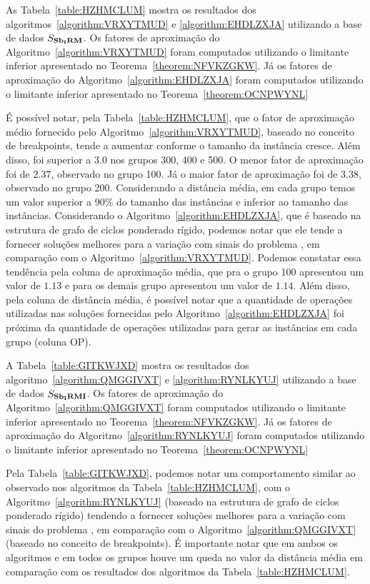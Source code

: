 As Tabela~\ref{table:HZHMCLUM} mostra os resultados dos algoritmos~\ref{algorithm:VRXYTMUD} e \ref{algorithm:EHDLZXJA} utilizando a base de dados $S_{\textbf{Sb\textsubscript{I}RM}}{}$. Os fatores de aproximação do Algoritmo~\ref{algorithm:VRXYTMUD} foram computados utilizando o limitante inferior apresentado no Teorema~\ref{theorem:NFVKZGKW}. Já os fatores de aproximação do Algoritmo~\ref{algorithm:EHDLZXJA} foram computados utilizando o limitante inferior apresentado no Teorema~\ref{theorem:OCNPWYNL}



É possível notar, pela Tabela~\ref{table:HZHMCLUM}, que o fator de aproximação médio fornecido pelo Algoritmo~\ref{algorithm:VRXYTMUD}, baseado no conceito de breakpoints, tende a aumentar conforme o tamanho da instância cresce. Além disso, foi superior a $3.0$ nos grupos 300, 400 e 500. O menor fator de aproximação foi de $2.37$, observado no grupo 100. Já o maior fator de aproximação foi de $3.38$, observado no grupo 200. Considerando a distância média, em cada grupo temos um valor superior a 90\% do tamanho das instâncias e inferior ao tamanho das instâncias. Considerando o Algoritmo~\ref{algorithm:EHDLZXJA}, que é baseado na estrutura de grafo de ciclos ponderado rígido, podemos notar que ele tende a fornecer soluções melhores para a variação com sinais do problema \SbIRM{}, em comparação com o Algoritmo~\ref{algorithm:VRXYTMUD}. Podemos constatar essa tendência pela coluna de aproximação média, que pra o grupo 100 apresentou um valor de $1.13$ e para os demais grupo apresentou um valor de $1.14$. Além disso, pela coluna de distância média, é possível notar que a quantidade de operações utilizadas nas soluções fornecidas pelo Algoritmo~\ref{algorithm:EHDLZXJA} foi próxima da quantidade de operações utilizadas para gerar as instâncias em cada grupo (coluna OP).

A Tabela~\ref{table:GITKWJXD} mostra os resultados dos algoritmo~\ref{algorithm:QMGGIVXT} e \ref{algorithm:RYNLKYUJ} utilizando a base de dados $S_{\textbf{Sb\textsubscript{I}RMI}}{}$. Os fatores de aproximação do Algoritmo~\ref{algorithm:QMGGIVXT} foram computados utilizando o limitante inferior apresentado no Teorema~\ref{theorem:NFVKZGKW}. Já os fatores de aproximação do Algoritmo~\ref{algorithm:RYNLKYUJ} foram computados utilizando o limitante inferior apresentado no Teorema~\ref{theorem:OCNPWYNL}



Pela Tabela~\ref{table:GITKWJXD}, podemos notar um comportamento similar ao observado nos algoritmos da Tabela~\ref{table:HZHMCLUM}, com o Algoritmo~\ref{algorithm:RYNLKYUJ} (baseado na estrutura de grafo de ciclos ponderado rígido) tendendo a fornecer soluções melhores para a variação com sinais do problema \SbIRMI{}, em comparação com o Algoritmo~\ref{algorithm:QMGGIVXT} (baseado no conceito de breakpoints). É importante notar que em ambos os algoritmos e em todos os grupos houve um queda no valor da distância média em comparação com os resultados dos algoritmos da Tabela~\ref{table:HZHMCLUM}.

